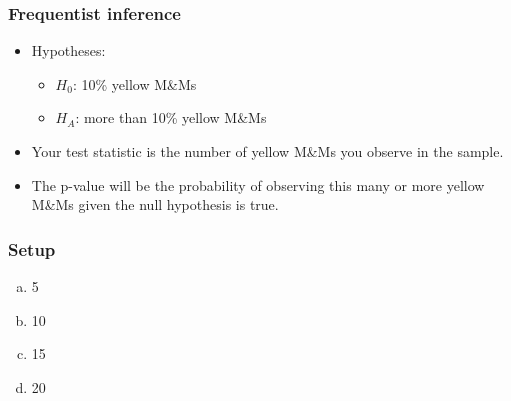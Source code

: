 \documentclass[11pt,containsverbatim,handout,xcolor=xelatex,dvipsnames,table]{beamer}
\begin{document}
\begin{frame}
\frametitle{Frequentist inference}

\begin{itemize}

\item Hypotheses:
\begin{itemize}
\item $H_0$: 10\% yellow M\&Ms
\item $H_A$: more than 10\% yellow M\&Ms 
\end{itemize}

\item Your test statistic is the number of yellow M\&Ms you observe in the sample. 

\item The p-value will be the probability of observing this many or more yellow M\&Ms given the null hypothesis is true.

\end{itemize}

\end{frame}


\begin{frame}
\frametitle{Setup}


\begin{multicols}{4}
\begin{enumerate}[(a)]
\item 5
\item 10
\item 15
\item 20
\end{enumerate}
\end{multicols}

\pause


\end{frame}

\end{document}

